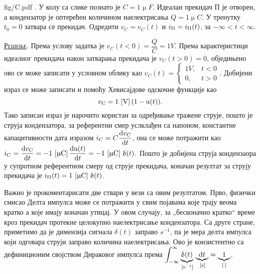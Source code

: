 \noindent
\begin{slikaDesno}[0.833]{fig/C.pdf}\noindent
\textbf{\ID}. \label{ID:capID}
У колу са слике познато је 
$C = 1 \unit{\upmu F}$. 
Идеалан прекидач П је отворен, а кондензатор је оптерећен количином
наелектрисања $Q = 1 \unit{\upmu C}$. У тренутку $t_0 = 0$ затвара се прекидач. 
Одредити $v_{C} = v_{C}(t)$        
и $i_{\Uppi} = i_{\Uppi}(t)$, за $-\infty < t < \infty$. 
\end{slikaDesno}

\textsc{\underline{Решење}}.
Према услову задатка је 
\vspace{1mm}
$v_C(t < 0) = \dfrac{Q}{C} = 1\unit{V}$. Према карактеристици идеалног прекидача
након затварања прекидача је $v_C(t > 0) = 0$, обједињено ово се може записати у условном облику као 
$
v_C(t) = 
\begin{cases}
        1\unit{V},&  t < 0 \\
        0,        &  t > 0
\end{cases}.
$ Добијени израз се може записати и помоћу Хевисајдове одскочне функције као 
\begin{equation}
v_{\rm C} = 1\,\left[\mathrm{V}\right] ( 1 - {\rm u}(t) ). 
\end{equation}
Тако записан израз је нарочито користан за одређивање тражене струје, пошто је струја кондензатора, 
за референтни смер услклађен са напоном, 
константне капацитивности дата изразом $i_C = C\dfrac{{\rm d} v_C}{{\rm d} t}$, она се може потражити као
$
i_C = \dfrac{{\rm d} v_{\rm C}}{{\rm d} t} = - 1\,\left[\mathrm{\upmu C}\right] \dfrac{{\rm d} {\rm u}(t)}{{\rm d} t}  = 
- 1\,\left[\mathrm{\upmu C}\right] \, \updelta(t). 
$
Пошто је добијена струја кондензаора у супротном референтном смеру од струје прекидача, коначан 
резултат за струју прекидача је 
$i_{\Uppi}(t) = 1\,\left[\mathrm{\upmu C}\right] \, \updelta(t)$.

Важно је прокоментарисати две ствари у вези са овим резултатом. Прво, физички смисао Делта импулса може
се потражити у свим појавама које трају веома кратко а које имају коначан утицај. У овом случају, 
за „бесконачно кратко“ време кроз прекидач протекне целокупно наелектрисање кондензатора. Са друге 
стране, приметимо да је димензија сигнала $\delta(t)$ заправо $\unit{s^{-1}}$, па је мера делта импулса
који одговара струји заправо количина наелектрисања. Ово је конзистентно са дефиниционим својством
Дираковог импулса према $\displaystyle \int_{-\infty}^{\infty} 
\underbrace{\updelta(t)}_{\,\left[\mathrm{s^{-1}}\right]} \, 
\underbrace{{\rm d} t}_{\,\left[\mathrm{s}\right]} = \underbrace{1}_{[\cdot]}$.